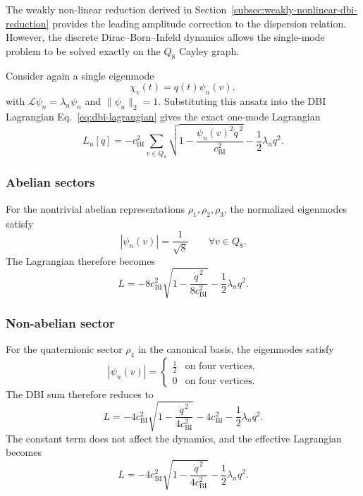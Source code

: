 \documentclass[11pt,a4paper]{article}
\begin{document}
  The weakly non-linear reduction derived in
  Section~\ref{subsec:weakly-nonlinear-dbi-reduction} provides the leading
  amplitude correction to the dispersion relation.
  However, the discrete Dirac--Born--Infeld dynamics allows the
  single-mode problem to be solved exactly on the $Q_8$ Cayley graph.

  Consider again a single eigenmode
  \[
    \chi_v(t) = q(t)\psi_n(v),
  \]
  with $\mathcal{L}\psi_n = \lambda_n \psi_n$ and $\|\psi_n\|_2=1$.
  Substituting this ansatz into the DBI Lagrangian
  Eq.~\eqref{eq:dbi-lagrangian} gives the exact one-mode Lagrangian
  \begin{equation}
    L_n[q]
    =
    -c_{\mathrm{BI}}^2
    \sum_{v\in Q_8}
    \sqrt{1-\frac{\psi_n(v)^2\dot q^{\,2}}{c_{\mathrm{BI}}^2}}
    -
    \frac12\lambda_n q^2 .
  \end{equation}

  \subsubsection*{Abelian sectors}

    For the nontrivial abelian representations $\rho_1,\rho_2,\rho_3$,
    the normalized eigenmodes satisfy
    \[
      |\psi_n(v)| = \frac{1}{\sqrt{8}}
      \qquad
      \forall v\in Q_8 .
    \]
    The Lagrangian therefore becomes
    \begin{equation}
      L
      =
      -8c_{\mathrm{BI}}^2
      \sqrt{1-\frac{\dot q^{\,2}}{8c_{\mathrm{BI}}^2}}
      -
      \frac12\lambda_n q^2 .
    \end{equation}

  \subsubsection*{Non-abelian sector}

    For the quaternionic sector $\rho_4$ in the canonical basis,
    the eigenmodes satisfy
    \[
      |\psi_n(v)| =
      \begin{cases}
        \frac12 & \text{on four vertices}, \\
        0 & \text{on four vertices}.
      \end{cases}
    \]
    The DBI sum therefore reduces to
    \begin{equation}
      L
      =
      -4c_{\mathrm{BI}}^2
      \sqrt{1-\frac{\dot q^{\,2}}{4c_{\mathrm{BI}}^2}}
      -4c_{\mathrm{BI}}^2
      -
      \frac12\lambda_n q^2 .
    \end{equation}
    The constant term does not affect the dynamics, and the effective
    Lagrangian becomes
    \begin{equation}
      L
      =
      -4c_{\mathrm{BI}}^2
      \sqrt{1-\frac{\dot q^{\,2}}{4c_{\mathrm{BI}}^2}}
      -
      \frac12\lambda_n q^2 .
    \end{equation}
\end{document}

